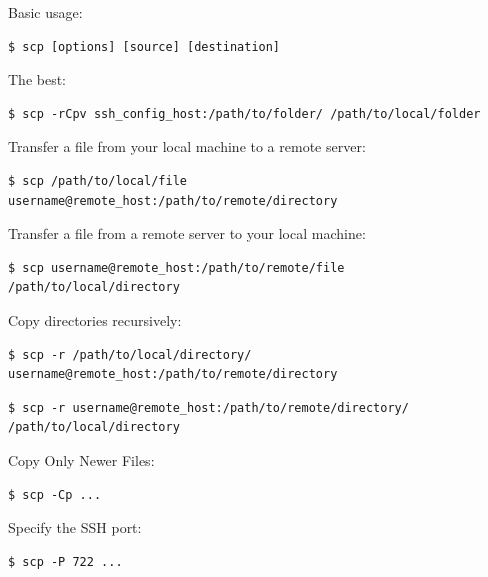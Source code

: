 \documentclass{article}
\newenvironment{codetemplate}[1][]{%
  \mybasecolorbox[#1]
  \itshape
}{%
  \endmybasecolorbox
}
\begin{document}
Basic usage:
\begin{codetemplate}{}
\begin{verbatim}
$ scp [options] [source] [destination]
\end{verbatim}
\end{codetemplate}

The best:
\begin{codetemplate}{}
\begin{verbatim}
$ scp -rCpv ssh_config_host:/path/to/folder/ /path/to/local/folder
\end{verbatim}
\end{codetemplate}

Transfer a file from your local machine to a remote server:
\begin{codetemplate}{}
\begin{verbatim}
$ scp /path/to/local/file username@remote_host:/path/to/remote/directory
\end{verbatim}
\end{codetemplate}

Transfer a file from a remote server to your local machine:
\begin{codetemplate}{}
\begin{verbatim}
$ scp username@remote_host:/path/to/remote/file /path/to/local/directory
\end{verbatim}
\end{codetemplate}

Copy directories recursively:
\begin{codetemplate}{}
\begin{verbatim}
$ scp -r /path/to/local/directory/ username@remote_host:/path/to/remote/directory
\end{verbatim}
\end{codetemplate}
\begin{codetemplate}{}
\begin{verbatim}
$ scp -r username@remote_host:/path/to/remote/directory/ /path/to/local/directory
\end{verbatim}
\end{codetemplate}

Copy Only Newer Files:
\begin{codetemplate}{}
\begin{verbatim}
$ scp -Cp ...
\end{verbatim}
\end{codetemplate}

Specify the SSH port:
\begin{codetemplate}{}
\begin{verbatim}
$ scp -P 722 ...
\end{verbatim}
\end{codetemplate}
\end{document}
